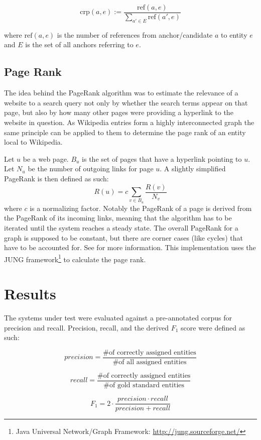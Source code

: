 \documentclass[runningheads,a4paper]{llncs}
\begin{document}
{$$\mathrm{crp}(a, e) := \frac{\mathrm{ref}(a, e)}{{\sum\limits_{a'\in E} \mathrm{ref}(a', e)}}$$

where $\mathrm{ref}(a, e)$ is the number of references from anchor/candidate $a$ to entity $e$ and $E$ is the set of all anchors referring to $e$.

\subsection{Page Rank}
The idea behind the PageRank\cite{pageRank} algorithm was to estimate the relevance of a website to a search query not only by whether the search terms appear on that page, but also by how many other pages were providing a hyperlink to the website in question. As Wikipedia entries form a highly interconnected graph the same principle can be applied to them to determine the page rank of an entity local to Wikipedia.

Let $u$ be a web page. $B_u$ is the set of pages that have a hyperlink pointing to $u$. Let $N_u$ be the number of outgoing links for page $u$. A slightly simplified PageRank is then defined as such: 
$$R(u) = c \sum_{v \in B_u} \frac{R(v)}{N_v}$$
where $c$ is a normalizing factor. Notably the PageRank of a page is derived from the PageRank of its incoming links, meaning that the algorithm has to be iterated until the system reaches a steady state. The overall PageRank for a graph is supposed to be constant, but there are corner cases (like cycles) that have to be accounted for. See \cite{pageRank} for more information. This implementation uses the JUNG framework\footnote{Java Universal Network/Graph Framework: \url{http://jung.sourceforge.net/}} to calculate the page rank.

\section{Results}\label{sec:results}

The systems under test were evaluated against a pre-annotated corpus for precision and recall. Precision, recall, and the derived $F_1$ score were defined as such:

$$ precision = \frac{\text{\# of correctly assigned entities}}{\text{\# of all assigned entities}} $$

$$ recall = \frac{\text{\# of correctly assigned entities}}{\text{\# of gold standard entities}} $$

$$ F_1 = 2 \cdot \frac{precision \cdot recall}{precision + recall} $$

}
\end{document}

